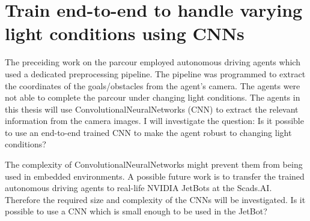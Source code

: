 \section*{Train end-to-end to handle varying light conditions using CNNs}

The preceiding work on the parcour employed autonomous driving agents which used a dedicated preprocessing pipeline. The pipeline was programmed to extract the coordinates of the goals/obstacles from the agent's camera. The agents were not able to complete the parcour under changing light conditions. The agents in this thesis will use ConvolutionalNeuralNetworks (CNN) to extract the relevant information from the camera images. I will investigate the question: Is it possible to use an end-to-end trained CNN to make the agent robust to changing light conditions?

The complexity of ConvolutionalNeuralNetworks might prevent them from being used in embedded environments. A possible future work is to transfer the trained autonomous driving agents to real-life NVIDIA JetBots at the Scads.AI. Therefore the required size and complexity of the CNNs will be investigated. Is it possible to use a CNN which is small enough to be used in the JetBot?







